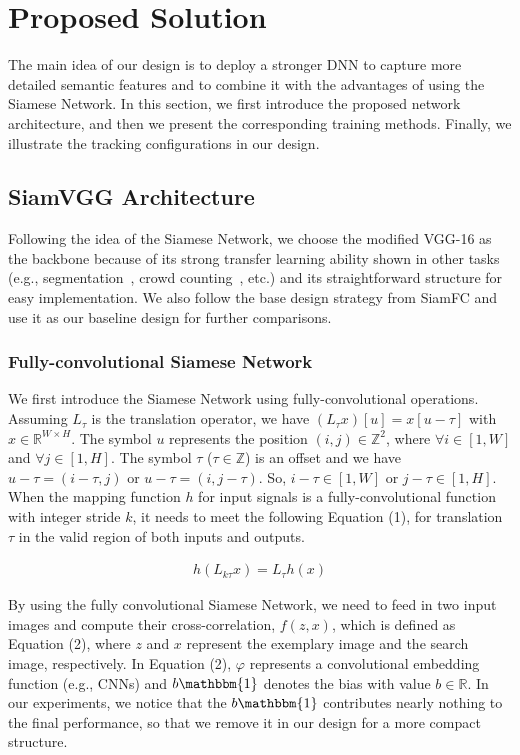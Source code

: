 \documentclass[runningheads]{llncs}
\begin{document}
\section{Proposed Solution}
\label{sec:proposed}

The main idea of our design is to deploy a stronger DNN to capture more detailed semantic features and to combine it with the advantages of using the Siamese Network. In this section, we first introduce the proposed network architecture, and then we present the corresponding training methods. Finally, we illustrate the tracking configurations in our design. 

\subsection{SiamVGG Architecture}

Following the idea of the Siamese Network, we choose the modified VGG-16 as the backbone because of its strong transfer learning ability shown in other tasks (e.g., segmentation~\cite{long2015fully}, crowd counting~\cite{li2018csrnet}, etc.) 
and its straightforward structure for easy implementation. We also follow the base design strategy from SiamFC and use it as our baseline design for further comparisons.
 
\subsubsection{Fully-convolutional Siamese Network}

We first introduce the Siamese Network using fully-convolutional operations. Assuming $L_{\tau}$ is the translation operator, we have $(L_{\tau}x)[u] = x[u - {\tau}]$ with $x\in \mathbb{R}^{W \times H}$. The symbol $u$ represents the position $(i,j) \in \mathbb{Z}^2$, where $\forall i \in [1,W]$ and $\forall j \in [1,H]$. 
The symbol $\tau$ ($\tau \in \mathbb{Z}$) is an offset and we have $u-\tau = (i-\tau,j)$ or $u-\tau = (i,j-\tau)$. So, $i-\tau \in [1,W]$ or $j-\tau \in [1,H]$. When the mapping function $h$ for input signals is a fully-convolutional function with integer stride $k$, it needs to meet the following Equation (1), for translation $\tau$ in the valid region of both inputs and outputs.


\begin{align}
h(L_{k\tau}x) = L_{\tau}h(x)
\end{align}

By using the fully convolutional Siamese Network, we need to feed in two input images and compute their cross-correlation, $f(z, x)$, which is defined as Equation (2), where $z$ and $x$ represent the exemplary image and the search image, respectively. In Equation (2), $\varphi$ represents a convolutional embedding function (e.g., CNNs) and $b\mathbbm{1}$ denotes the bias with value $b \in \mathbb{R}$. In our experiments, we notice that the $b\mathbbm{1}$ contributes nearly nothing to the final performance, so that we remove it in our design for a more compact structure.
\end{document}

